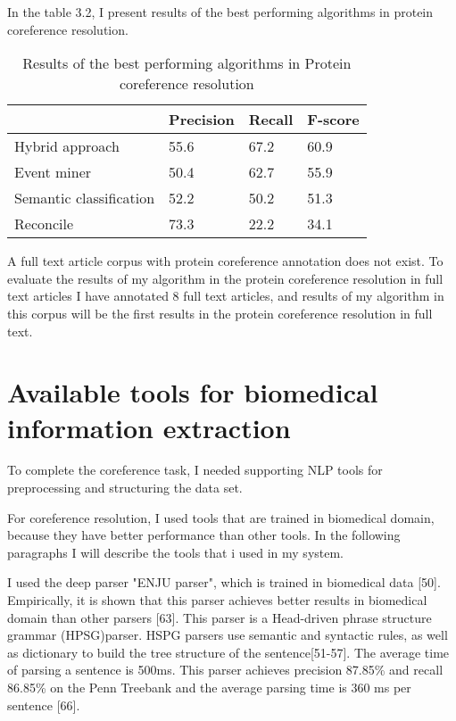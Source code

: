  In the table 3.2, I present results of the best performing algorithms in protein coreference resolution.
\begin{table}[h]
  \begin{center}
 	\begin{tabular}{|l C{2cm} C{2cm} C{2cm}|} 
 		\hline
  		& Precision & Recall & F-score \\ [1ex] 
 		\hline
 		Hybrid approach & 55.6 & 67.2 & 60.9 \\ [1ex] 
 		\hline
 		Event miner & 50.4 & 62.7 & 55.9 \\ [1ex] 
 		\hline
 		Semantic classification & 52.2 & 50.2 & 51.3 \\ [1ex] 
 		\hline
 		Reconcile & 73.3 & 22.2 & 34.1 \\ [1ex] 
 		\hline
	\end{tabular}
  \end{center} 
  \caption{Results of the best performing algorithms in Protein coreference resolution}
  \label{table3.2}
\end{table}

A full text article corpus with protein coreference annotation does not exist. To evaluate the results of my algorithm in the protein coreference resolution in full text articles I have annotated 8 full text articles, and results of my algorithm in this corpus will be the first  results in the protein coreference resolution in full text.
 
\section{Available tools for biomedical information extraction}

To complete the coreference task, I needed supporting NLP tools for preprocessing and structuring the data set.

For coreference resolution, I used tools that are trained in biomedical domain, because they have better performance than other tools. In the following paragraphs I will describe the tools that i used in my system.

I used the deep parser "ENJU parser", which is trained in biomedical data [50]. Empirically, it is shown that this parser achieves better results in biomedical domain than other parsers [63]. This parser is a Head-driven phrase structure grammar (HPSG)parser. HSPG parsers use semantic and syntactic rules, as well as dictionary to build the tree structure of the sentence[51-57]. The average time of parsing a sentence is 500ms. This parser achieves precision 87.85\% and recall 86.85\% on the Penn Treebank and the average parsing time is 360 ms per sentence [66].

